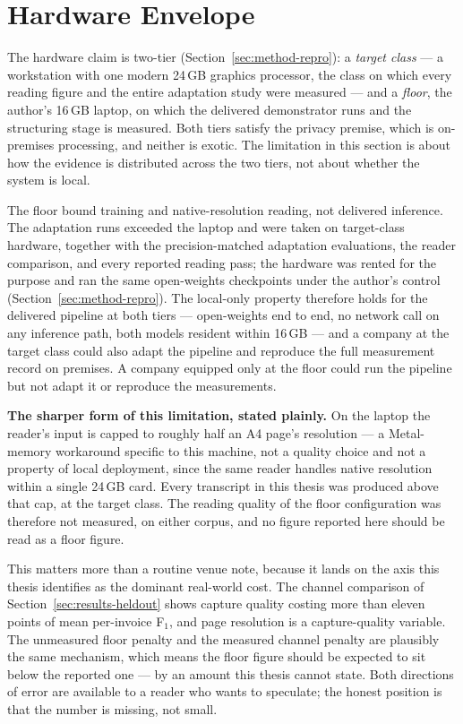 \section{Hardware Envelope}
\label{sec:lim-hardware}

The hardware claim is two-tier (Section~\ref{sec:method-repro}): a \emph{target class} --- a
workstation with one modern 24\,\ac{GB} graphics processor, the class on which every reading
figure and the entire adaptation study were measured --- and a \emph{floor}, the author's
16\,\ac{GB} laptop, on which the delivered demonstrator runs and the structuring stage is
measured. Both tiers satisfy the privacy premise, which is on-premises processing, and neither
is exotic. The limitation in this section is about how the evidence is distributed across the
two tiers, not about whether the system is local.

The floor bound training and native-resolution reading, not delivered inference. The
adaptation runs exceeded the laptop and were taken on target-class hardware, together with
the precision-matched adaptation evaluations, the reader comparison, and every reported
reading pass; the hardware was rented for the purpose and ran the same open-weights
checkpoints under the author's control (Section~\ref{sec:method-repro}). The local-only property
therefore holds for the delivered pipeline at both tiers --- open-weights end to end, no
network call on any inference path, both models resident within 16\,\ac{GB} --- and a company at
the target class could also adapt the pipeline and reproduce the full measurement record on
premises. A company equipped only at the floor could run the pipeline but not adapt it or
reproduce the measurements.

\textbf{The sharper form of this limitation, stated plainly.} On the laptop the reader's input
is capped to roughly half an A4 page's resolution --- a Metal-memory workaround specific to
this machine, not a quality choice and not a property of local deployment, since the same
reader handles native resolution within a single 24\,\ac{GB} card. Every transcript in this
thesis was produced above that cap, at the target class. The reading quality of the floor
configuration was therefore not measured, on either corpus, and no figure reported here should
be read as a floor figure.

This matters more than a routine venue note, because it lands on the axis this thesis identifies
as the dominant real-world cost. The channel comparison of Section~\ref{sec:results-heldout} shows
capture quality costing more than eleven points of mean per-invoice F$_1$, and page resolution
is a capture-quality variable. The unmeasured floor penalty and the measured channel penalty are
plausibly the same mechanism, which means the floor figure should be expected to sit below the
reported one --- by an amount this thesis cannot state. Both directions of error are available to
a reader who wants to speculate; the honest position is that the number is missing, not small.

